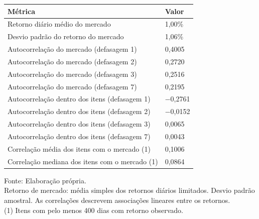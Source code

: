 \begingroup
\setlength{}
\setlength{}
\fontsize{12.0pt}{14.4pt}\selectfont

\setlength{\LTpost}{0mm}
\begin{longtable}{@{\extracolsep{\fill}}ll}

\toprule
\textbf{Métrica} & \textbf{Valor} \\ 
\midrule\addlinespace[2.5pt]
Retorno diário médio do mercado & 1,00\% \\
Desvio padrão do retorno do mercado & 1,06\% \\
Autocorrelação do mercado (defasagem 1) & 0,4005 \\
Autocorrelação do mercado (defasagem 2) & 0,2720 \\
Autocorrelação do mercado (defasagem 3) & 0,2516 \\
Autocorrelação do mercado (defasagem 7) & 0,2195 \\
Autocorrelação dentro dos itens (defasagem 1) & −0,2761 \\
Autocorrelação dentro dos itens (defasagem 2) & −0,0152 \\
Autocorrelação dentro dos itens (defasagem 3) & 0,0065 \\
Autocorrelação dentro dos itens (defasagem 7) & 0,0043 \\
Correlação média dos itens com o mercado (1) & 0,1006 \\
Correlação mediana dos itens com o mercado (1) & 0,0864 \\
\bottomrule
\end{longtable}
\begin{minipage}{\linewidth}
Fonte: Elaboração própria.\\
Retorno de mercado: média simples dos retornos diários limitados. Desvio padrão amostral. As correlações descrevem associações lineares entre os retornos.\\
(1) Itens com pelo menos 400 dias com retorno observado.\\
\end{minipage}
\endgroup

